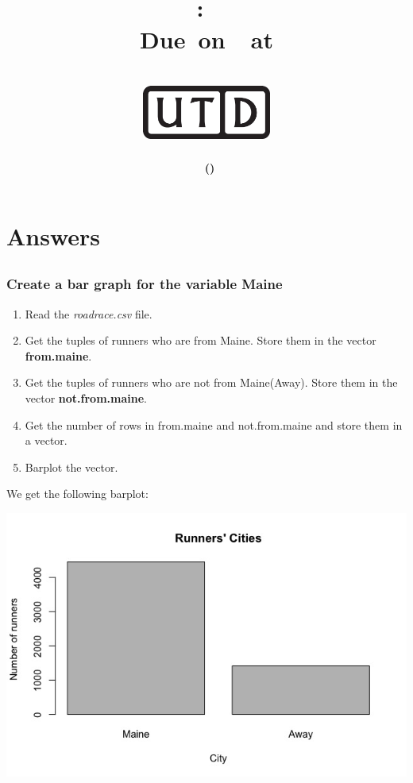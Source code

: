 \documentclass[12pt,letterpaper,titlepage,en-US]{article}
\title{
    \vspace{1in}
    \textmd{\textbf{\hmwkClassName \\\hmwkClass:\ \hmwkTitle }}\\
     \normalsize\vspace{0.1in}\small{Due\ on\ \DTMusedate{DueDate}\ at \DTMusetime{DueDate} }\\
    \vspace{0.1in}\large{\textit{\hmwkClassInstructor}}\\
    \vspace{0.5in}\includegraphics[height=2.4em]{UTD_logo_BW}\\
    \vspace{2in}
}
\author{\textbf{\hmwkAuthorName\ \footnotesize{(\hmwkAuthorNetID)}} \\ }
\date{}
\begin{document}
\maketitle


\tableofcontents

\pagebreak
{}


\section{Answers}

\subsection{}
\subsubsection{Create a bar graph for the variable Maine}
\begin{enumerate}


\item Read the \emph{roadrace.csv} file.
\item Get the tuples of runners who are from Maine. Store them in the vector \textbf{from.maine}.
\item Get the tuples of runners who are not from Maine(Away). Store them in the vector \textbf{not.from.maine}.
\item Get the number of rows in from.maine and not.from.maine and store them in a vector.
\item Barplot the vector.
\end{enumerate}
We get the following barplot:
\begin{center}
\includegraphics[scale=0.6]{1a.jpeg}
\end{center}
\end{document}
